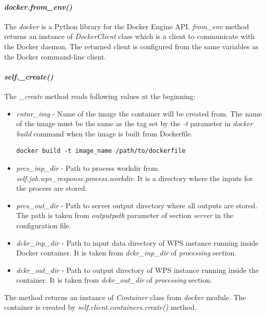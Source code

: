 \documentclass[12pt,a4paper]{article}
\begin{document}
\paragraph{\textit{docker.from\_env()}} The \textit{docker} is a Python library for the Docker Engine API. \textit{from\_env} method
returns an instance of \textit{DockerClient} class which is a client to communicate with the Docker daemon. The returned client is
configured from the same variables as the Docker command-line client.

\paragraph{\textit{self.\_create()}} The \textit{\_create} method reads following values at the beginning:
\begin{itemize}
\item \textit{cntnr\_img} - Name of the image the container will be created from. The name of the image must be the same as the tag
set by the \textit{-t} parameter in \textit{docker build} command when the image is built from Dockerfile.

\bigskip
\begin{lstlisting}[basicstyle=\small,caption={Docker build command}]
docker build -t image_name /path/to/dockerfile
\end{lstlisting}

\item \textit{prcs\_inp\_dir} - Path to process workdir from \textit{self.job.wps\_response.process.workdir}. It is a directory where the
inputs for the process are stored.
\item \textit{prcs\_out\_dir} - Path to server output directory where all outputs are stored. The path is taken from \textit{outputpath}
parameter of section \textit{server} in the configuration file.
\item \textit{dckr\_inp\_dir} - Path to input data directory of WPS instance running inside Docker container. It is taken from 
\textit{dckr\_inp\_dir} of \textit{processing} section.
\item \textit{dckr\_out\_dir} - Path to output directory of WPS instance running inside the container. It is taken from 
\textit{dckr\_out\_dir} of \textit{processing} section.
\end{itemize}

The method returns an instance of \textit{Container} class from \textit{docker} module. The container is created by
\textit{self.client.containers.create()} method. 
\end{document}
